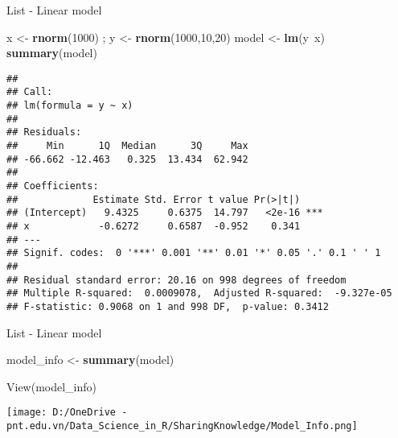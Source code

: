 \documentclass[
  ignorenonframetext,
]{beamer}
\newenvironment{Shaded}{}{}
\newcommand{\DecValTok}[1]{\textcolor[rgb]{0.25,0.63,0.44}{#1}}
\newcommand{\KeywordTok}[1]{\textcolor[rgb]{0.00,0.44,0.13}{\textbf{#1}}}
\newcommand{\NormalTok}[1]{#1}
\newcommand{\OperatorTok}[1]{\textcolor[rgb]{0.40,0.40,0.40}{#1}}
\newcommand{\StringTok}[1]{\textcolor[rgb]{0.25,0.44,0.63}{#1}}
\begin{document}
\begin{frame}[fragile]{List - Linear model}
\protect\hypertarget{list---linear-model}{}

\begin{Shaded}
\begin{Highlighting}[]
\NormalTok{x <-}\StringTok{ }\KeywordTok{rnorm}\NormalTok{(}\DecValTok{1000}\NormalTok{) ; y <-}\StringTok{ }\KeywordTok{rnorm}\NormalTok{(}\DecValTok{1000}\NormalTok{,}\DecValTok{10}\NormalTok{,}\DecValTok{20}\NormalTok{)}
\NormalTok{model <-}\StringTok{ }\KeywordTok{lm}\NormalTok{(y}\OperatorTok{~}\NormalTok{x)}
\KeywordTok{summary}\NormalTok{(model)}
\end{Highlighting}
\end{Shaded}

\begin{verbatim}
## 
## Call:
## lm(formula = y ~ x)
## 
## Residuals:
##     Min      1Q  Median      3Q     Max 
## -66.662 -12.463   0.325  13.434  62.942 
## 
## Coefficients:
##             Estimate Std. Error t value Pr(>|t|)    
## (Intercept)   9.4325     0.6375  14.797   <2e-16 ***
## x            -0.6272     0.6587  -0.952    0.341    
## ---
## Signif. codes:  0 '***' 0.001 '**' 0.01 '*' 0.05 '.' 0.1 ' ' 1
## 
## Residual standard error: 20.16 on 998 degrees of freedom
## Multiple R-squared:  0.0009078,  Adjusted R-squared:  -9.327e-05 
## F-statistic: 0.9068 on 1 and 998 DF,  p-value: 0.3412
\end{verbatim}

\end{frame}

\begin{frame}[fragile]{List - Linear model}
\protect\hypertarget{list---linear-model-1}{}

\begin{Shaded}
\begin{Highlighting}[]
\NormalTok{model_info <-}\StringTok{ }\KeywordTok{summary}\NormalTok{(model)}
\end{Highlighting}
\end{Shaded}

View(model\_info)

\texttt{[image: D:/OneDrive - pnt.edu.vn/Data\_Science\_in\_R/SharingKnowledge/Model\_Info.png]}

\end{frame}
\end{document}
